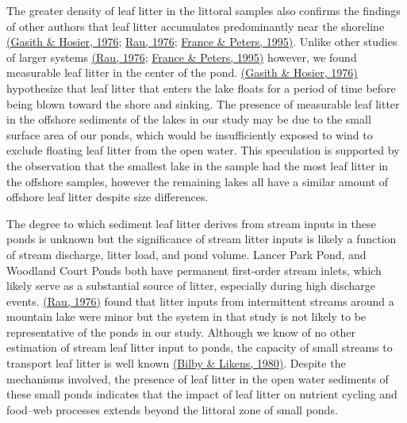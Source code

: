 \documentclass[12pt,letter]{article}
\begin{document}
The greater density of leaf litter in the littoral samples also confirms the findings of other authors that leaf litter accumulates predominantly near the shoreline \hyperref[csl:6]{(Gasith \& Hosier, 1976}; \hyperref[csl:36]{Rau, 1976}; \hyperref[csl:37]{France \& Peters, 1995)}. Unlike other studies of larger systems \hyperref[csl:36]{(Rau, 1976}; \hyperref[csl:37]{France \& Peters, 1995)}  however, we found measurable leaf litter in the center of the pond. \hyperref[csl:6]{(Gasith \& Hosier, 1976)} hypothesize that leaf litter that enters the lake floats for a period of time before being blown toward the shore and sinking. The presence of measurable leaf litter in the offshore sediments of the lakes in our study may be due to the small surface area of our ponds, which would be insufficiently exposed to wind to exclude floating leaf litter from the open water. This speculation is supported by the observation that the smallest lake in the sample had the most leaf litter in the offshore samples, however the remaining lakes all have a similar amount of offshore leaf litter despite size differences. 

The degree to which sediment leaf litter derives from stream inputs in these ponds is unknown but the significance of stream litter inputs is likely a function of stream discharge, litter load, and pond volume. Lancer Park Pond, and Woodland Court Ponds both have permanent first-order stream inlets, which likely serve as a substantial source of litter, especially during high discharge events. \hyperref[csl:36]{(Rau, 1976)} found that litter inputs from intermittent streams around a mountain lake were minor but the system in that study is not likely to be representative of the ponds in our study. Although we know of no other estimation of stream leaf litter input to ponds, the capacity of small streams to transport leaf litter is well known \hyperref[csl:38]{(Bilby \& Likens, 1980)}. Despite the mechanisms involved, the presence of leaf litter in the open water sediments of these small ponds indicates that the impact of leaf litter on nutrient cycling and food--web processes extends beyond the littoral zone of small ponds.
\end{document}
